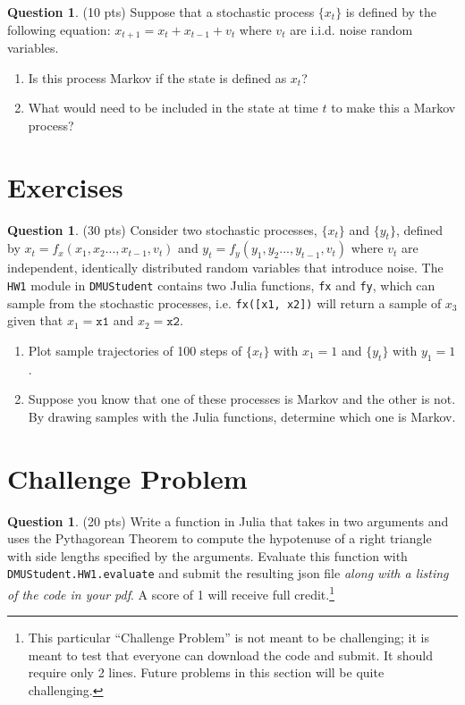 \documentclass{article}
\theoremstyle{definition}
\newtheorem{question}[thm]{Question}
\begin{document}
\begin{question} (10 pts)
    Suppose that a stochastic process $\{x_t\}$ is defined by the following equation: $x_{t+1} = x_t + x_{t-1} + v_{t}$ where $v_t$ are i.i.d. noise random variables.
    \begin{enumerate}[label=(\alph*)]
        \item Is this process Markov if the state is defined as $x_t$?
        \item What would need to be included in the state at time $t$ to make this a Markov process?
    \end{enumerate}
\end{question}

\section{Exercises}

\begin{question} (30 pts)
    Consider two stochastic processes, $\{x_t\}$ and $\{y_t\}$, defined by $x_t = f_x(x_{1}, x_{2}... , x_{t-1}, v_t)$ and $y_t = f_y(y_{1}, y_{2}... , y_{t-1}, v_t)$ where $v_t$ are independent, identically distributed random variables that introduce noise. The \texttt{HW1} module in \texttt{DMUStudent} contains two Julia functions, \texttt{fx} and \texttt{fy}, which can sample from the stochastic processes, i.e. \texttt{fx([x1, x2])} will return a sample of $x_3$ given that $x_1 = \texttt{x1}$ and $x_2 = \texttt{x2}$.

    \begin{enumerate}[label=\alph*)]
        \item Plot sample trajectories of 100 steps of $\{x_t\}$ with $x_1=1$ and $\{y_t\}$ with $y_1=1$.
        \item Suppose you know that one of these processes is Markov and the other is not. By drawing samples with the Julia functions, determine which one is Markov.
    \end{enumerate}
\end{question}

\section{Challenge Problem}

\begin{question} (20 pts)
    Write a function in Julia that takes in two arguments and uses the Pythagorean Theorem to compute the hypotenuse of a right triangle with side lengths specified by the arguments. Evaluate this function with \texttt{DMUStudent.HW1.evaluate} and submit the resulting json file \textit{along with a listing of the code in your pdf}. A score of 1 will receive full credit.\footnote{This particular ``Challenge Problem'' is not meant to be challenging; it is meant to test that everyone can download the code and submit. It should require only 2 lines. Future problems in this section will be quite challenging.}
\end{question}
\end{document}
